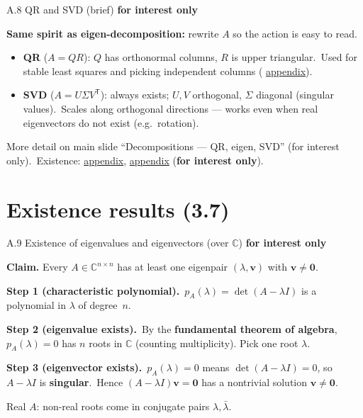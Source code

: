 \documentclass[11pt,aspectratio=169]{beamer}
\newcommand{\InterestOnly}{\textcolor{mAccent}{\textbf{for interest only}}}
\newcommand{\AppendixLink}[1]{%
  \hyperlink{#1}{\textcolor{mAccent}{appendix}}}
\begin{document}
\begin{frame}{A.8 QR and SVD (brief)}
  \footnotesize
  \InterestOnly

  \medskip
  \textbf{Same spirit as eigen-decomposition:} rewrite $A$ so the action is easy to read.

  \medskip
  \begin{itemize}
    \item \textbf{QR} ($A=QR$): $Q$ has orthonormal columns, $R$ is upper triangular.\
      Used for stable least squares and picking independent columns (\AppendixLink{sec:orthonormal-matrices}).
    \item \textbf{SVD} ($A=U\Sigma V^{\mathsf T}$): always exists; $U,V$ orthogonal, $\Sigma$ diagonal (singular values).\
      Scales along orthogonal directions --- works even when real eigenvectors do not exist (e.g.\ rotation).
  \end{itemize}

  \medskip
  {\scriptsize More detail on main slide ``Decompositions --- QR, eigen, SVD'' (for interest only).\
  Existence: \AppendixLink{sec:qr-exists}, \AppendixLink{sec:svd-exists} (\InterestOnly).}
\end{frame}

\section{Existence results (3.7)}

\begin{frame}{A.9 Existence of eigenvalues and eigenvectors (over $\mathbb{C}$)}
  \hypertarget{sec:eigenvalue-exists}{}
  \footnotesize
  \InterestOnly

  \medskip
  \textbf{Claim.} Every $A\in\mathbb{C}^{n\times n}$ has at least one eigenpair $(\lambda,\mathbf{v})$ with $\mathbf{v}\neq \mathbf{0}$.

  \medskip
  \textbf{Step 1 (characteristic polynomial).}\
  $p_A(\lambda)=\det(A-\lambda I)$ is a polynomial in $\lambda$ of degree~$n$.

  \medskip
  \textbf{Step 2 (eigenvalue exists).}\
  By the \textbf{fundamental theorem of algebra}, $p_A(\lambda)=0$ has $n$ roots in $\mathbb{C}$ (counting multiplicity). Pick one root $\lambda$.

  \medskip
  \textbf{Step 3 (eigenvector exists).}\
  $p_A(\lambda)=0$ means $\det(A-\lambda I)=0$, so $A-\lambda I$ is \textbf{singular}.\
  Hence $(A-\lambda I)\mathbf{v}=\mathbf{0}$ has a nontrivial solution $\mathbf{v}\neq \mathbf{0}$.

  \medskip
  {\scriptsize Real $A$: non-real roots come in conjugate pairs $\lambda,\bar\lambda$.}
\end{frame}
\end{document}
